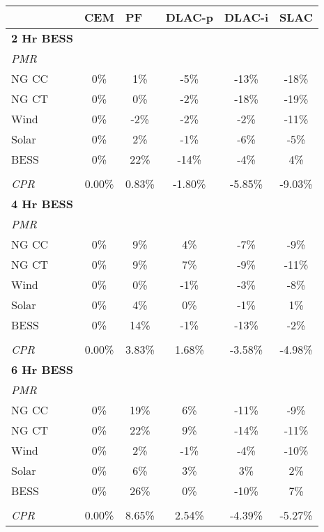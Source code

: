\begin{table}[]
\centering
\begin{tabular}{lccccc}
\hline
& \multicolumn{1}{l}{\textbf{CEM}} & \multicolumn{1}{l}{\textbf{PF}} & \multicolumn{1}{l}{\textbf{DLAC-p}} & \multicolumn{1}{l}{\textbf{DLAC-i}} & \multicolumn{1}{l}{\textbf{SLAC}} \\ \hline
\textbf{2 Hr BESS} &  &  &  &  & \\
 \quad \textit{PMR}  &  &  &  &  & \\
\qquad NG CC & 0\% & 1\% & -5\% & -13\% & -18\% \\
\qquad NG CT & 0\% & 0\% & -2\% & -18\% & -19\% \\
\qquad Wind & 0\% & -2\% & -2\% & -2\% & -11\% \\
\qquad Solar & 0\% & 2\% & -1\% & -6\% & -5\% \\
\qquad BESS & 0\% & 22\% & -14\% & -4\% & 4\% \\
&  &  &  &  & \\
\quad \textit{CPR} & 0.00\% & 0.83\% & -1.80\% & -5.85\% & -9.03\% \\\hline
\textbf{4 Hr BESS} &  &  &  &  & \\
 \quad \textit{PMR}  &  &  &  &  & \\
\qquad NG CC & 0\% & 9\% & 4\% & -7\% & -9\% \\
\qquad NG CT & 0\% & 9\% & 7\% & -9\% & -11\% \\
\qquad Wind & 0\% & 0\% & -1\% & -3\% & -8\% \\
\qquad Solar & 0\% & 4\% & 0\% & -1\% & 1\% \\
\qquad BESS & 0\% & 14\% & -1\% & -13\% & -2\% \\
&  &  &  &  & \\
\quad \textit{CPR} & 0.00\% & 3.83\% & 1.68\% & -3.58\% & -4.98\% \\\hline
\textbf{6 Hr BESS} &  &  &  &  & \\
 \quad \textit{PMR}  &  &  &  &  & \\
\qquad NG CC & 0\% & 19\% & 6\% & -11\% & -9\% \\
\qquad NG CT & 0\% & 22\% & 9\% & -14\% & -11\% \\
\qquad Wind & 0\% & 2\% & -1\% & -4\% & -10\% \\
\qquad Solar & 0\% & 6\% & 3\% & 3\% & 2\% \\
\qquad BESS & 0\% & 26\% & 0\% & -10\% & 7\% \\
&  &  &  &  & \\
\quad \textit{CPR} & 0.00\% & 8.65\% & 2.54\% & -4.39\% & -5.27\% \\\hline

\end{tabular}
\end{table}
